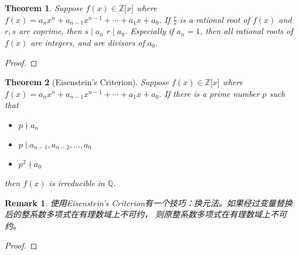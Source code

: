 \documentclass[onecolumn]{ctexart}
\newtheorem{theorem}{Theorem}
\newtheorem{remark}{Remark}
\begin{document}
\begin{theorem}
  Suppose $f(x) \in \mathbb{Z}\lbrack x \rbrack$ where $f(x) = a_n x^n + 
  a_{n-1} x^{n-1} + \cdots + a_1 x + a_0$. If $\frac{r}{s}$ is a rational root 
  of $f(x)$ and $r, s$ are coprime, then $s \mid a_n$ $r \mid a_0$. Especially if 
  $a_n = 1$, then all rational roots of $f(x)$ are integers, and are divisors of $a_0$.
\end{theorem}
\begin{proof}
\end{proof}

\begin{theorem}[Eisenstein's Criterion]
  Suppose $f(x) \in \mathbb{Z}\lbrack x \rbrack$ where $f(x) = a_n x^n + 
  a_{n-1} x^{n-1} + \cdots + a_1 x + a_0$. If there is a prime number $p$ such that
  \begin{itemize}
    \item $p \nmid a_n$
    \item $p \mid a_{n-1}, a_{n-2}, \ldots, a_0$
    \item $p^2 \nmid a_0$
  \end{itemize}
  then $f(x)$ is irreducible in $\mathbb{Q}$.
\end{theorem}

\begin{remark}
  使用Eisenstein's Criterion有一个技巧：换元法。如果经过变量替换后的整系数多项式在有理数域上不可约，
  则原整系数多项式在有理数域上不可约。
\end{remark}
\begin{proof}
  
\end{proof}
\end{document}
